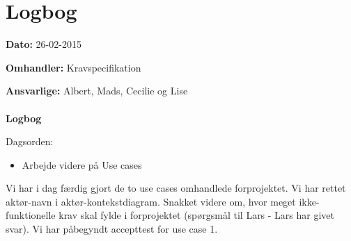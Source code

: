 \chapter{Logbog}

\textbf{Dato:} 26-02-2015

\textbf{Omhandler:} Kravspecifikation

\textbf{Ansvarlige:} Albert, Mads, Cecilie og Lise\\ 
\\
\textbf{Logbog}

Dagsorden:
\begin{itemize}
	\item Arbejde videre på Use cases
\end{itemize}


Vi har i dag færdig gjort de to use cases omhandlede forprojektet. Vi har rettet aktør-navn i aktør-kontekstdiagram. 
Snakket videre om, hvor meget ikke-funktionelle krav skal fylde i forprojektet (spørgsmål til Lars - Lars har givet svar).
Vi har påbegyndt accepttest for use case 1.